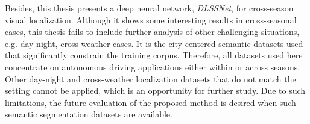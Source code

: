 Besides, this thesis presents a deep neural network, {\em DLSSNet}, for cross-season visual localization. 
Although it shows some interesting results in cross-seasonal cases, this thesis fails to include further analysis of other challenging situations, e.g. day-night, cross-weather cases. 
It is the city-centered semantic datasets used that significantly constrain the training corpus.  
Therefore, all datasets used here concentrate on autonomous driving applications either within or across seasons.  
Other day-night and cross-weather localization datasets that do not match the setting cannot be applied, which is an opportunity for further study.
Due to such limitations, the future evaluation of the proposed method is desired when such semantic segmentation datasets are available.